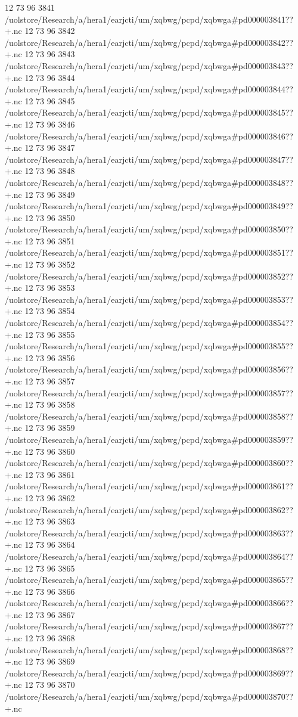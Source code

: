 12 73 96
3841
/uolstore/Research/a/hera1/earjcti/um/xqbwg/pcpd/xqbwga#pd000003841??+.nc
12 73 96
3842
/uolstore/Research/a/hera1/earjcti/um/xqbwg/pcpd/xqbwga#pd000003842??+.nc
12 73 96
3843
/uolstore/Research/a/hera1/earjcti/um/xqbwg/pcpd/xqbwga#pd000003843??+.nc
12 73 96
3844
/uolstore/Research/a/hera1/earjcti/um/xqbwg/pcpd/xqbwga#pd000003844??+.nc
12 73 96
3845
/uolstore/Research/a/hera1/earjcti/um/xqbwg/pcpd/xqbwga#pd000003845??+.nc
12 73 96
3846
/uolstore/Research/a/hera1/earjcti/um/xqbwg/pcpd/xqbwga#pd000003846??+.nc
12 73 96
3847
/uolstore/Research/a/hera1/earjcti/um/xqbwg/pcpd/xqbwga#pd000003847??+.nc
12 73 96
3848
/uolstore/Research/a/hera1/earjcti/um/xqbwg/pcpd/xqbwga#pd000003848??+.nc
12 73 96
3849
/uolstore/Research/a/hera1/earjcti/um/xqbwg/pcpd/xqbwga#pd000003849??+.nc
12 73 96
3850
/uolstore/Research/a/hera1/earjcti/um/xqbwg/pcpd/xqbwga#pd000003850??+.nc
12 73 96
3851
/uolstore/Research/a/hera1/earjcti/um/xqbwg/pcpd/xqbwga#pd000003851??+.nc
12 73 96
3852
/uolstore/Research/a/hera1/earjcti/um/xqbwg/pcpd/xqbwga#pd000003852??+.nc
12 73 96
3853
/uolstore/Research/a/hera1/earjcti/um/xqbwg/pcpd/xqbwga#pd000003853??+.nc
12 73 96
3854
/uolstore/Research/a/hera1/earjcti/um/xqbwg/pcpd/xqbwga#pd000003854??+.nc
12 73 96
3855
/uolstore/Research/a/hera1/earjcti/um/xqbwg/pcpd/xqbwga#pd000003855??+.nc
12 73 96
3856
/uolstore/Research/a/hera1/earjcti/um/xqbwg/pcpd/xqbwga#pd000003856??+.nc
12 73 96
3857
/uolstore/Research/a/hera1/earjcti/um/xqbwg/pcpd/xqbwga#pd000003857??+.nc
12 73 96
3858
/uolstore/Research/a/hera1/earjcti/um/xqbwg/pcpd/xqbwga#pd000003858??+.nc
12 73 96
3859
/uolstore/Research/a/hera1/earjcti/um/xqbwg/pcpd/xqbwga#pd000003859??+.nc
12 73 96
3860
/uolstore/Research/a/hera1/earjcti/um/xqbwg/pcpd/xqbwga#pd000003860??+.nc
12 73 96
3861
/uolstore/Research/a/hera1/earjcti/um/xqbwg/pcpd/xqbwga#pd000003861??+.nc
12 73 96
3862
/uolstore/Research/a/hera1/earjcti/um/xqbwg/pcpd/xqbwga#pd000003862??+.nc
12 73 96
3863
/uolstore/Research/a/hera1/earjcti/um/xqbwg/pcpd/xqbwga#pd000003863??+.nc
12 73 96
3864
/uolstore/Research/a/hera1/earjcti/um/xqbwg/pcpd/xqbwga#pd000003864??+.nc
12 73 96
3865
/uolstore/Research/a/hera1/earjcti/um/xqbwg/pcpd/xqbwga#pd000003865??+.nc
12 73 96
3866
/uolstore/Research/a/hera1/earjcti/um/xqbwg/pcpd/xqbwga#pd000003866??+.nc
12 73 96
3867
/uolstore/Research/a/hera1/earjcti/um/xqbwg/pcpd/xqbwga#pd000003867??+.nc
12 73 96
3868
/uolstore/Research/a/hera1/earjcti/um/xqbwg/pcpd/xqbwga#pd000003868??+.nc
12 73 96
3869
/uolstore/Research/a/hera1/earjcti/um/xqbwg/pcpd/xqbwga#pd000003869??+.nc
12 73 96
3870
/uolstore/Research/a/hera1/earjcti/um/xqbwg/pcpd/xqbwga#pd000003870??+.nc
